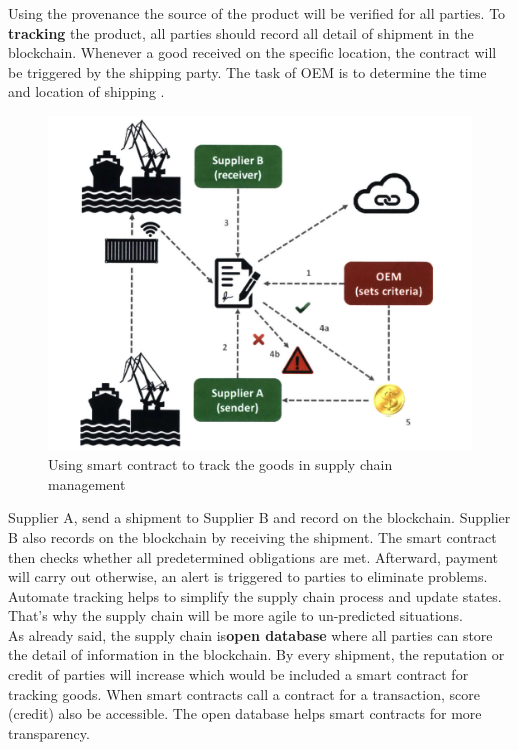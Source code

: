 Using the provenance the source of the product will be verified for all parties. To \textbf{tracking} the product, all parties should record all detail of shipment in the blockchain. Whenever a good received on the specific location, the contract will be triggered by the shipping party. The task of OEM is to determine the time and location of shipping .\\
\begin{center}
	
	\begin{figure}[htb!]
		
		\begin{minipage}{0.55\linewidth}
			\centering
			\includegraphics[width=1.65\textwidth]{images/chap03_tracking_SCM.png}
		\end{minipage}
		\caption{Using smart contract to track the goods in supply chain management}
		
	\end{figure}
	
\end{center}

Supplier A, send a shipment to Supplier B and record on the blockchain. Supplier B also records on the blockchain by receiving the shipment. The smart contract then checks whether all predetermined obligations are met.
Afterward,  payment will carry out otherwise, an alert is triggered to parties to eliminate problems.  Automate tracking helps to simplify the supply chain process and update states. That's why the supply chain will be more agile to un-predicted situations.\\ 
As already said, the supply chain is\textbf{open database} where all parties can store the detail of information in the blockchain. By every shipment, the reputation or credit of parties will increase which would be included a smart contract for tracking goods. When smart contracts call a contract for a transaction,  score (credit) also be accessible. The open database helps smart contracts for more transparency\cite{Angwei}.


